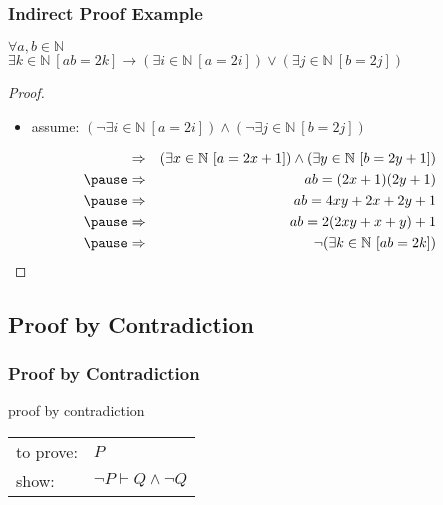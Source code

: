\documentclass[dvipsnames]{beamer}
\begin{document}
\begin{frame}
  \frametitle{Indirect Proof Example}

  \begin{theorem}
    $\forall a,b \in \mathbb{N}$\\
      $\exists k \in \mathbb{N}~[ab=2k] \rightarrow
        (\exists i \in \mathbb{N}~[a=2i]) \vee
        (\exists j \in \mathbb{N}~[b=2j])$
  \end{theorem}

  \pause
  \begin{proof}
    \begin{itemize}
      \item assume: $(\neg \exists i \in \mathbb{N}~[a=2i])
                          \wedge (\neg \exists j \in \mathbb{N}~[b=2j])$
    \end{itemize}

    \vspace{-2em}
    \begin{eqnarray*}
      & \Rightarrow & (\exists x \in \mathbb{N}~[a=2x+1])
                          \wedge (\exists y \in \mathbb{N}~[b=2y+1])\\\pause
      & \Rightarrow & ab=(2x+1)(2y+1)\\\pause
      & \Rightarrow & ab=4xy+2x+2y+1\\\pause
      & \Rightarrow & ab=2(2xy+x+y)+1\\\pause
      & \Rightarrow & \neg (\exists k \in \mathbb{N}~[ab=2k])
    \end{eqnarray*}
  \end{proof}
\end{frame}

\subsection{Proof by Contradiction}

\begin{frame}
  \frametitle{Proof by Contradiction}

  \begin{block}{proof by contradiction}
    \begin{tabular}{ll}
      to prove: & $P$\\
      show:     & $\neg P \vdash Q \wedge \neg Q$
    \end{tabular}
  \end{block}
\end{frame}
\end{document}
